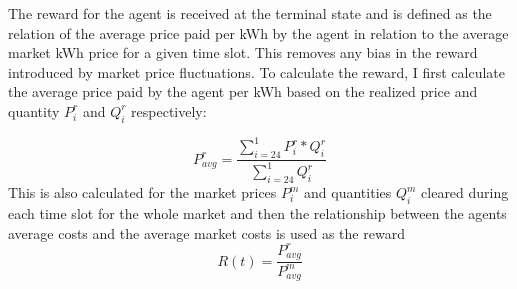 The reward for the agent is received at the terminal state and is defined as the relation of the average price paid per
\ac{kWh} by the agent in relation to the average market \ac{kWh} price for a given time slot. This removes any bias in
the reward introduced by market price fluctuations. To calculate the reward, I first calculate the average price paid by
the agent per \ac{kWh} based on the realized price and quantity $P^r_i$ and $Q^r_i$ respectively:

\begin{equation}
    \label{eq:avgp_per_ts}
    P^{r}_{avg} =\frac{\sum ^{1}_{i=24} P^{r}_{i} *Q^{r}_{i}}{\sum ^{1}_{i=24} Q^{r}_{i}}
\end{equation}
This is also calculated for the market prices $P^m_{i}$ and quantities $Q^m_i$ cleared during each time slot for the whole market and then the
relationship between the agents average costs and the average market costs is used as the reward
\begin{equation}
    R(t) = \frac{P^r_{avg}}{P^m_{avg}}
\end{equation}

%
%
%


%
%
%
%
%
%
%
%

